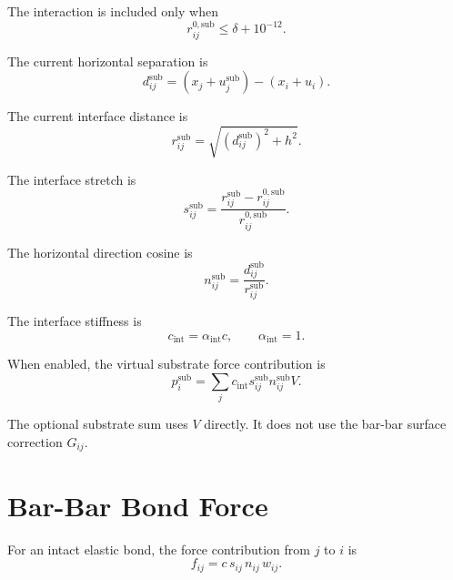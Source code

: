\documentclass[11pt]{article}
\begin{document}
The interaction is included only when
\begin{equation}
    r_{ij}^{0,\mathrm{sub}}
    \le
    \delta + 10^{-12}.
\end{equation}

The current horizontal separation is
\begin{equation}
    d_{ij}^{\mathrm{sub}}
    =
    (x_j+u_j^{\mathrm{sub}})
    -
    (x_i+u_i).
\end{equation}

The current interface distance is
\begin{equation}
    r_{ij}^{\mathrm{sub}}
    =
    \sqrt{
        \left(d_{ij}^{\mathrm{sub}}\right)^2+h^2
    }.
\end{equation}

The interface stretch is
\begin{equation}
    s_{ij}^{\mathrm{sub}}
    =
    \frac{
        r_{ij}^{\mathrm{sub}}-r_{ij}^{0,\mathrm{sub}}
    }{
        r_{ij}^{0,\mathrm{sub}}
    }.
\end{equation}

The horizontal direction cosine is
\begin{equation}
    n_{ij}^{\mathrm{sub}}
    =
    \frac{d_{ij}^{\mathrm{sub}}}{r_{ij}^{\mathrm{sub}}}.
\end{equation}

The interface stiffness is
\begin{equation}
    c_{\mathrm{int}} =
    \alpha_{\mathrm{int}}c,
    \qquad
    \alpha_{\mathrm{int}}=1 .
\end{equation}

When enabled, the virtual substrate force contribution is
\begin{equation}
    p_i^{\mathrm{sub}}
    =
    \sum_j
    c_{\mathrm{int}}
    s_{ij}^{\mathrm{sub}}
    n_{ij}^{\mathrm{sub}}
    V .
\end{equation}

The optional substrate sum uses \(V\) directly. It does not use the bar-bar surface
correction \(G_{ij}\).

\section{Bar-Bar Bond Force}

For an intact elastic bond, the force contribution from \(j\) to \(i\) is
\begin{equation}
    f_{ij}
    =
    c\,s_{ij}\,n_{ij}\,w_{ij}.
\end{equation}
\end{document}
